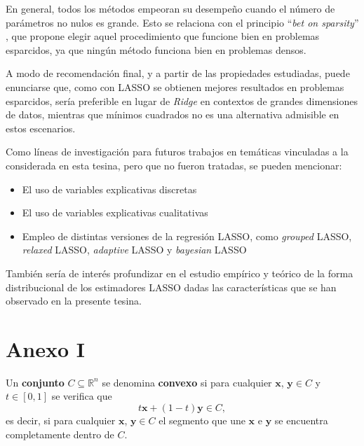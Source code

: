 \documentclass[a4paper,12pt]{report}
\begin{document}
En general, todos los métodos empeoran su desempeño cuando el número de parámetros no nulos es grande. Esto se relaciona con el principio “\textit{bet on sparsity}” \citep{friedman2001elements}, que propone elegir aquel procedimiento que funcione bien en problemas esparcidos, ya que ningún método funciona bien en problemas densos.

A modo de recomendación final, y a partir de las propiedades estudiadas, puede enunciarse que, como con LASSO se obtienen mejores resultados en problemas esparcidos, sería preferible en lugar de \textit{Ridge} en contextos de grandes dimensiones de datos, mientras que mínimos cuadrados no es una alternativa admisible en estos escenarios.

\vspace{1cm}

Como líneas de investigación para futuros trabajos en temáticas vinculadas a la considerada en esta tesina, pero que no fueron tratadas, se pueden mencionar:

\begin{itemize}
\item El uso de variables explicativas discretas  
\item El uso de variables explicativas cualitativas
\item Empleo de distintas versiones de la regresión LASSO, como \textit{grouped} LASSO, \textit{relaxed} LASSO, \textit{adaptive} LASSO y \textit{bayesian} LASSO
\end{itemize}

También sería de interés profundizar en el estudio empírico y teórico de la forma distribucional de los estimadores LASSO dadas las características que se han observado en la presente tesina.

\renewcommand{\bibname}{Referencias}



\chapter*{Anexo I}

\newpage

Un \textbf{conjunto} $C \subseteq \mathbb{R}^n$ se denomina \textbf{convexo} si para cualquier $\boldsymbol{x}$, $\boldsymbol{y} \in C$ y $t \in [0,1]$ se verifica que
\begin{equation}
t\boldsymbol{x}+(1-t)\boldsymbol{y} \in C,
\end{equation}
es decir, si para cualquier $\boldsymbol{x}$, $\boldsymbol{y} \in C$ el segmento que une $\boldsymbol{x}$ e $\boldsymbol{y}$ se encuentra completamente dentro de $C$.
\end{document}
